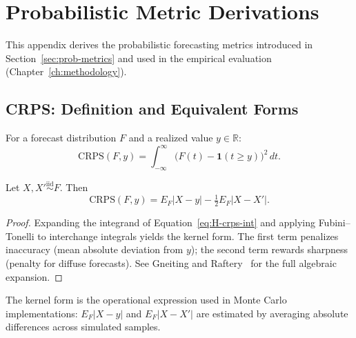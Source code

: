 \chapter{Probabilistic Metric Derivations}
\label{app:H}

This appendix derives the probabilistic forecasting metrics introduced in
Section~\ref{sec:prob-metrics} and used in the empirical evaluation
(Chapter~\ref{ch:methodology}).


\section{CRPS: Definition and Equivalent Forms}
\label{app:H-crps-def}

\begin{definition}
For a forecast distribution $F$ and a realized value $y \in \mathbb{R}$:
\begin{equation}
\label{eq:H-crps-int}
\mathrm{CRPS}(F, y)
= \int_{-\infty}^{\infty} \big( F(t) - \mathbf{1}(t \geq y) \big)^2 \, dt.
\end{equation}
\end{definition}

\begin{theorem}
\label{thm:H-kernel}
Let $X, X' \overset{\mathrm{iid}}{\sim} F$. Then
\begin{equation}
\label{eq:H-crps-kernel}
\mathrm{CRPS}(F, y) = E_F |X - y| - \tfrac{1}{2} E_F |X - X'|.
\end{equation}
\end{theorem}

\begin{proof}
Expanding the integrand of Equation~\ref{eq:H-crps-int} and applying
Fubini–Tonelli to interchange integrals yields the kernel form. The
first term penalizes inaccuracy (mean absolute deviation from $y$); the
second term rewards sharpness (penalty for diffuse forecasts). See
Gneiting and Raftery~\cite{gneiting2007strictly} for the full algebraic
expansion.
\end{proof}

The kernel form is the operational expression used in Monte Carlo
implementations: $E_F |X - y|$ and $E_F |X - X'|$ are estimated by
averaging absolute differences across simulated samples.


